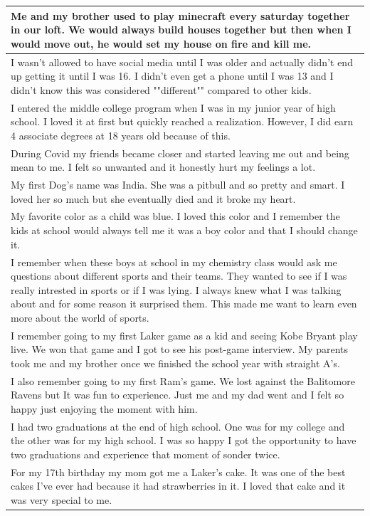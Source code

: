 \documentclass[
  .7em,
  letterpaper,
  DIV=11,
  numbers=noendperiod]{scrartcl}
\begin{document}
\begin{table}
\begin{tabular}{l}
\hline
Me and my brother used to play minecraft every saturday together in our loft. We would always build houses together but then when I would move out, he would set my house on fire and kill me.\\
\hline
I wasn't allowed to have social media until I was older and actually didn't end up getting it until I was 16. I didn't even get a phone until I was 13 and I didn't know this was considered ""different"" compared to other kids.\\
\hline
I entered the middle college program when I was in my junior year of high school. I loved it at first but quickly reached a realization. However, I did earn 4 associate degrees at 18 years old because of this.\\
\hline
During Covid my friends became closer and started leaving me out and being mean to me. I felt so unwanted and it honestly hurt my feelings a lot.\\
\hline
My first Dog's name was India. She was a pitbull and so pretty and smart. I loved her so much but she eventually died and it broke my heart.\\
\hline
My favorite color as a child was blue. I loved this color and I remember the kids at school would always tell me it was a boy color and that I should change it.\\
\hline
I remember when these boys at school in my chemistry class would ask me questions about different sports and their teams. They wanted to see if I was really intrested in sports or if I was lying. I always knew what I was talking about and for some reason it surprised them. This made me want to learn even more about the world of sports.\\
\hline
I remember going to my first Laker game as a kid and seeing Kobe Bryant play live. We won that game and I got to see his post-game interview. My parents took me and my brother once we finished the school year with straight A's.\\
\hline
I also remember going to my first Ram's game. We lost against the Balitomore Ravens but It was fun to experience. Just me and my dad went and I felt so happy just enjoying the moment with him.\\
\hline
I had two graduations at the end of high school. One was for my college and the other was for my high school. I was so happy I got the opportunity to have two graduations and experience that moment of sonder twice.\\
\hline
For my 17th birthday my mom got me a Laker's cake. It was one of the best cakes I've ever had because it had strawberries in it. I loved that cake and it was very special to me.\\

\end{tabular}
\end{table}
\end{document}
